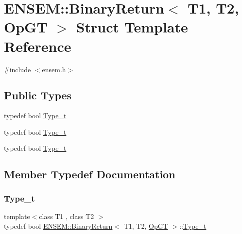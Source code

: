 \hypertarget{structENSEM_1_1BinaryReturn_3_01T1_00_01T2_00_01OpGT_01_4}{}\section{E\+N\+S\+EM\+:\+:Binary\+Return$<$ T1, T2, Op\+GT $>$ Struct Template Reference}
\label{structENSEM_1_1BinaryReturn_3_01T1_00_01T2_00_01OpGT_01_4}


{\ttfamily \#include $<$ensem.\+h$>$}

\subsection*{Public Types}
\begin{DoxyCompactItemize}
\item 
typedef bool \mbox{\hyperlink{structENSEM_1_1BinaryReturn_3_01T1_00_01T2_00_01OpGT_01_4_a421698302c7e07764108c7954de9f1c8}{Type\+\_\+t}}
\item 
typedef bool \mbox{\hyperlink{structENSEM_1_1BinaryReturn_3_01T1_00_01T2_00_01OpGT_01_4_a421698302c7e07764108c7954de9f1c8}{Type\+\_\+t}}
\item 
typedef bool \mbox{\hyperlink{structENSEM_1_1BinaryReturn_3_01T1_00_01T2_00_01OpGT_01_4_a421698302c7e07764108c7954de9f1c8}{Type\+\_\+t}}
\end{DoxyCompactItemize}


\subsection{Member Typedef Documentation}
\mbox{\label{structENSEM_1_1BinaryReturn_3_01T1_00_01T2_00_01OpGT_01_4_a421698302c7e07764108c7954de9f1c8}} 
\subsubsection{\texorpdfstring{Type\_t}{Type\_t}\hspace{0.1cm}{\footnotesize\ttfamily [1/3]}}
{\footnotesize\ttfamily template$<$class T1 , class T2 $>$ \\
typedef bool \mbox{\hyperlink{structENSEM_1_1BinaryReturn}{E\+N\+S\+E\+M\+::\+Binary\+Return}}$<$ T1, T2, \mbox{\hyperlink{structENSEM_1_1OpGT}{Op\+GT}} $>$\+::\mbox{\hyperlink{structENSEM_1_1BinaryReturn_3_01T1_00_01T2_00_01OpGT_01_4_a421698302c7e07764108c7954de9f1c8}{Type\+\_\+t}}}

